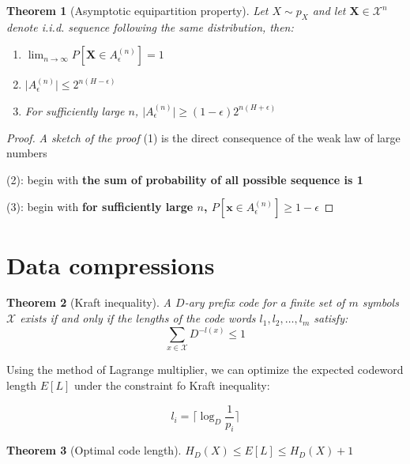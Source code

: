 \documentclass{article}
\newcommand{\norm}[1]{\vert {#1} \vert}
\newtheorem{theorem}{Theorem}[section]
\begin{document}
    \begin{theorem}[Asymptotic equipartition property]
        Let $X \sim p_X$ and let $\mathbf{X} \in \mathcal{X}^n$ denote i.i.d. sequence following the same distribution, then:

        \begin{enumerate}
            \item $\lim_{n \rightarrow \infty}P[\mathbf{X} \in A_\epsilon^{(n)}] = 1$
            \item $\norm{A_\epsilon^{(n)}} \leq 2^{n(H - \epsilon)}$
            \item For sufficiently large $n$, $\norm{A_\epsilon^{(n)}} \geq (1-\epsilon)2^{n(H+\epsilon)}$
        \end{enumerate}
    \end{theorem}

    \begin{proof}
        \textit{A sketch of the proof}
        (1) is the direct consequence of the weak law of large numbers

        (2): begin with \textbf{the sum of probability of all possible sequence is 1}

        (3): begin with \textbf{for sufficiently large $n$, $P[\mathbf{x} \in A_\epsilon^{(n)}] \geq 1 - \epsilon$}
    \end{proof}

\section{Data compressions}
    \begin{theorem}[Kraft inequality]
    A $D$-ary prefix code for a finite set of $m$ symbols $\mathcal{X}$ exists if and only if the lengths of the code words $l_1, l_2, \ldots, l_m$ satisfy:
    \begin{equation*}
        \sum_{x \in \mathcal{X}} D^{-l(x)} \leq 1
    \end{equation*}
    \end{theorem}

    Using the method of Lagrange multiplier, we can optimize the expected codeword length $E[L]$ under the constraint fo Kraft inequality:

    \begin{equation*}
        l_i = \lceil \log_D\frac{1}{p_i} \rceil
    \end{equation*}

    \begin{theorem}[Optimal code length]
    $H_D(X) \leq E[L] \leq H_D(X) + 1$
    \end{theorem}
\end{document}
